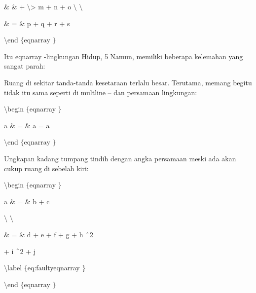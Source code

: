 \vspace{12pt}
\noindent 
 $  \&  $ $  \&  $ + $  \setminus  $> m + n + o  $  \setminus  $ $  \setminus  $ \par
\vspace{12pt}
\noindent 
 $  \&  $ =  $  \&  $ p + q + r + s \par
\vspace{12pt}
\noindent 
 $  \setminus  $end $  \{  $eqnarray $  \}  $ \par
\noindent 
\vspace{16pt}
\noindent 
Itu eqnarray -lingkungan Hidup, 5 Namun, memiliki beberapa kelemahan yang sangat parah: \par
\noindent 
 Ruang di sekitar tanda-tanda kesetaraan terlalu besar. Terutama, memang begitu tidak itu sama seperti di multline – dan persamaan lingkungan: \par
\vspace{12pt}
\noindent 
 $  \setminus  $begin $  \{  $eqnarray $  \}  $ \par
\vspace{12pt}
\noindent 
a  $  \&  $ =  $  \&  $ a = a \par
\vspace{12pt}
\noindent 
 $  \setminus  $end $  \{  $eqnarray $  \}  $ \par
\vspace{12pt}
\noindent 
Ungkapan kadang tumpang tindih dengan angka persamaan meski ada akan cukup ruang di sebelah kiri: \par
\vspace{12pt}
\noindent 
 $  \setminus  $begin $  \{  $eqnarray $  \}  $ \par
\vspace{12pt}
\noindent 
a  $  \&  $ =  $  \&  $ b + c \par
\noindent 
 $  \setminus  $ $  \setminus  $ \par
\vspace{12pt}
\noindent 
 $  \&  $ =  $  \&  $ d + e + f + g + h $  \string^  $2 \par
\vspace{12pt}
\noindent 
+ i $  \string^  $2 + j \par
\vspace{12pt}
\noindent 
 $  \setminus  $label $  \{  $eq:faultyeqnarray $  \}  $ \par
\vspace{12pt}
\noindent 
 $  \setminus  $end $  \{  $eqnarray $  \}  $ \par
\vspace{12pt}
